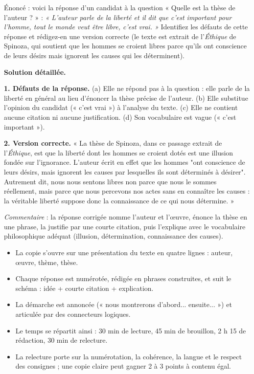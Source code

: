 \documentclass[11pt]{article}
\newcommand{\cle}[1]{{\popxbold\color{popdark}#1}}
\begin{document}
\begin{exoresolu}
Énoncé : voici la réponse d'un candidat à la question « Quelle est la thèse de l'auteur ? » : \emph{« L'auteur parle de la liberté et il dit que c'est important pour l'homme, tout le monde veut être libre, c'est vrai. »} Identifiez les défauts de cette réponse et rédigez-en une version correcte (le texte est extrait de l'\emph{Éthique} de Spinoza, qui soutient que les hommes se croient libres parce qu'ils ont conscience de leurs désirs mais ignorent les causes qui les déterminent).

\tcblower

\textbf{Solution détaillée.}

\textbf{1. Défauts de la réponse.} (a) Elle ne répond pas à la question : elle parle de la liberté en général au lieu d'énoncer la thèse précise de l'auteur. (b) Elle substitue l'opinion du candidat (« c'est vrai ») à l'analyse du texte. (c) Elle ne contient aucune citation ni aucune justification. (d) Son vocabulaire est vague (« c'est important »).

\textbf{2. Version correcte.} « La thèse de Spinoza, dans ce passage extrait de l'\emph{Éthique}, est que la liberté dont les hommes se croient dotés est une illusion fondée sur l'ignorance. L'auteur écrit en effet que les hommes "ont conscience de leurs désirs, mais ignorent les causes par lesquelles ils sont déterminés à désirer". Autrement dit, nous nous sentons libres non parce que nous le sommes réellement, mais parce que nous percevons nos actes sans en connaître les causes : la véritable liberté suppose donc la connaissance de ce qui nous détermine. »

\emph{Commentaire} : la réponse corrigée nomme l'auteur et l'œuvre, énonce la thèse en une phrase, la justifie par une courte citation, puis l'explique avec le vocabulaire philosophique adéquat (illusion, détermination, connaissance des causes).
\end{exoresolu}

\begin{aretenir}
\begin{itemize}
\item La copie s'ouvre sur une \cle{présentation du texte} en quatre lignes : auteur, œuvre, thème, thèse.
\item Chaque réponse est \cle{numérotée}, rédigée en phrases construites, et suit le schéma : idée + courte citation + explication.
\item La démarche est \cle{annoncée} (« nous montrerons d'abord... ensuite... ») et articulée par des connecteurs logiques.
\item Le temps se répartit ainsi : 30 min de lecture, 45 min de brouillon, 2 h 15 de rédaction, 30 min de relecture.
\item La relecture porte sur la numérotation, la cohérence, la langue et le respect des consignes ; une copie claire peut gagner 2 à 3 points à contenu égal.
\end{itemize}
\end{aretenir}
\end{document}
